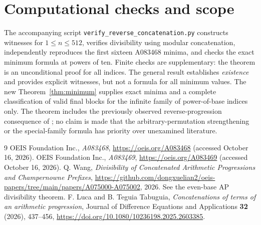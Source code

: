 \documentclass[11pt]{article}
\begin{document}
\section{Computational checks and scope}
The accompanying script \texttt{verify\_reverse\_concatenation.py}
constructs witnesses for $1\le n\le512$, verifies divisibility using
modular concatenation, independently reproduces the first sixteen
A083468 minima, and checks the exact minimum formula at powers of ten. Finite checks are supplementary: the theorem is an
unconditional proof for all indices.
The general result establishes \emph{existence} and provides explicit
witnesses, but not a formula for all minimum values. The new
Theorem~\ref{thm:minimum} supplies exact minima and a complete
classification of valid final blocks for the infinite family of
power-of-base indices only. The theorem includes the previously observed
reverse-progression consequence of \cite{wangAP}; no claim is made
that the arbitrary-permutation strengthening or the special-family
formula has priority over unexamined literature.
\begin{thebibliography}{9}
 OEIS Foundation Inc.,
  \emph{A083468}, \url{https://oeis.org/A083468}
  (accessed October 16, 2026).
 OEIS Foundation Inc.,
  \emph{A083469}, \url{https://oeis.org/A083469}
  (accessed October 16, 2026).
 Q. Wang,
  \emph{Divisibility of Concatenated Arithmetic Progressions and
  Champernowne Prefixes},
  \url{https://github.com/dongxuelian2/oeis-papers/tree/main/papers/A075000-A075002},
  2026. See the even-base AP divisibility theorem.
 F. Luca and B. Teguia Tabuguia,
 \emph{Concatenations of terms of an arithmetic progression},
 Journal of Difference Equations and Applications \textbf{32} (2026), 437--456,
 \url{https://doi.org/10.1080/10236198.2025.2603385}.
\end{thebibliography}
\end{document}
